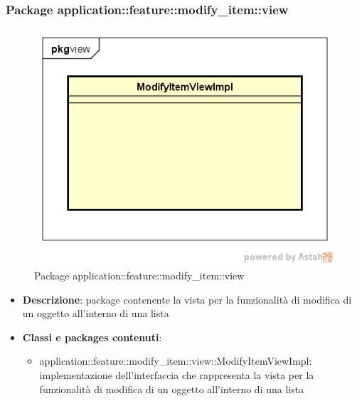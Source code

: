 \subsubsection{Package application::feature::modify\_item::view}
\label{Package application::feature::modify_item::view}
\begin{figure}[H]
	\centering
	\includegraphics[scale=0.5]{Sezioni/Packages/Application/modify_item_view.png}
	\caption{Package application::feature::modify\_item::view}
\end{figure}
\begin{itemize}
	\item \textbf{Descrizione}: package contenente la vista per la funzionalità di modifica di un oggetto all'interno di una lista
	\item \textbf{Classi e packages contenuti}:
	\begin{itemize}
	\item application::feature::modify\_item::view::ModifyItemViewImpl: implementazione dell'interfaccia che rappresenta la vista per la funzionalità di modifica di un oggetto all'interno di una lista
	\end{itemize}
\end{itemize}

